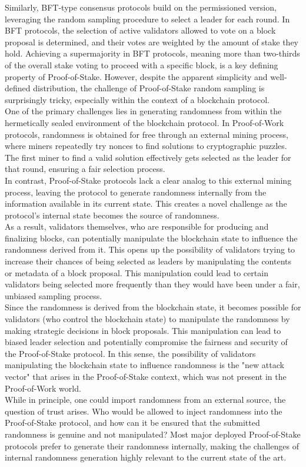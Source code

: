 Similarly, BFT-type consensus protocols build on the permissioned version, leveraging the random sampling procedure to select a leader for each round. In BFT protocols, the selection of active validators allowed to vote on a block proposal is determined, and their votes are weighted by the amount of stake they hold. Achieving a supermajority in BFT protocols, meaning more than two-thirds of the overall stake voting to proceed with a specific block, is a key defining property of Proof-of-Stake. However, despite the apparent simplicity and well-defined distribution, the challenge of Proof-of-Stake random sampling is surprisingly tricky, especially within the context of a blockchain protocol.\\
One of the primary challenges lies in generating randomness from within the hermetically sealed environment of the blockchain protocol. In Proof-of-Work protocols, randomness is obtained for free through an external mining process, where miners repeatedly try nonces to find solutions to cryptographic puzzles. The first miner to find a valid solution effectively gets selected as the leader for that round, ensuring a fair selection process.\\
In contrast, Proof-of-Stake protocols lack a clear analog to this external mining process, leaving the protocol to generate randomness internally from the information available in its current state. This creates a novel challenge as the protocol's internal state becomes the source of randomness.\\
As a result, validators themselves, who are responsible for producing and finalizing blocks, can potentially manipulate the blockchain state to influence the randomness derived from it. This opens up the possibility of validators trying to increase their chances of being selected as leaders by manipulating the contents or metadata of a block proposal. This manipulation could lead to certain validators being selected more frequently than they would have been under a fair, unbiased sampling process.\\
Since the randomness is derived from the blockchain state, it becomes possible for validators (who control the blockchain state) to manipulate the randomness by making strategic decisions in block proposals. This manipulation can lead to biased leader selection and potentially compromise the fairness and security of the Proof-of-Stake protocol. In this sense, the possibility of validators manipulating the blockchain state to influence randomness is the "new attack vector" that arises in the Proof-of-Stake context, which was not present in the Proof-of-Work world.\\
While in principle, one could import randomness from an external source, the question of trust arises. Who would be allowed to inject randomness into the Proof-of-Stake protocol, and how can it be ensured that the submitted randomness is genuine and not manipulated? Most major deployed Proof-of-Stake protocols prefer to generate their randomness internally, making the challenges of internal randomness generation highly relevant to the current state of the art.


